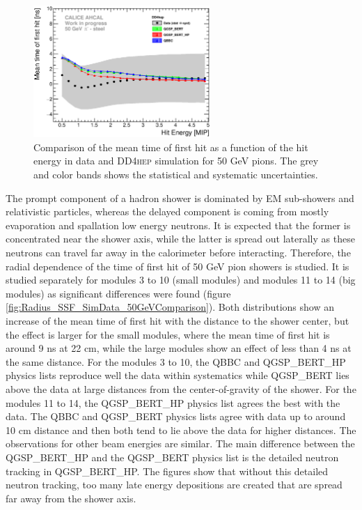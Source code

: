 \documentclass{JINST}
\newcommand\ddhep{\textsc{DD4hep}\xspace}
\begin{document}
\begin{figure}[htbp!]
  \centering
  \includegraphics[width=0.6\textwidth]{fig/Time_Energy_50GeV_DD4hep.eps}
  \caption{Comparison of the mean time of first hit as a function of the hit energy in data and \ddhep simulation for 50 GeV pions. The grey and color bands shows the statistical and systematic uncertainties.}
  \label{fig:Energy_SimData_50GeV}
\end{figure}

The prompt component of a hadron shower is dominated by EM sub-showers and relativistic particles, whereas the delayed component is coming from mostly evaporation and spallation low energy neutrons. It is expected that the former is concentrated near the shower axis, while the latter is spread out laterally as these neutrons can travel far away in the calorimeter before interacting. Therefore, the radial dependence of the time of first hit of 50 GeV pion showers is studied. It is studied separately for modules 3 to 10 (small modules) and modules 11 to 14 (big modules) as significant differences were found (figure \ref{fig:Radius_SSF_SimData_50GeVComparison}). Both distributions show an increase of the mean time of first hit with the distance to the shower center, but the effect is larger for the small modules, where the mean time of first hit is around 9 ns at 22 cm, while the large modules show an effect of less than 4 ns at the same distance.
For the modules 3 to 10, the QBBC and QGSP\_BERT\_HP physics lists reproduce well the data within systematics while QGSP\_BERT lies above the data at large distances from the center-of-gravity of the shower. For the modules 11 to 14, the QGSP\_BERT\_HP physics list agrees the best with the data. The QBBC and QGSP\_BERT physics lists agree with data up to around 10 cm distance and then both tend to lie above the data for higher distances. The observations for other beam energies are similar. The main difference between the QGSP\_BERT\_HP and the QGSP\_BERT physics list is the detailed neutron tracking in QGSP\_BERT\_HP. The figures show that without this detailed neutron tracking, too many late energy depositions are created that are spread far away from the shower axis.
\end{document}
